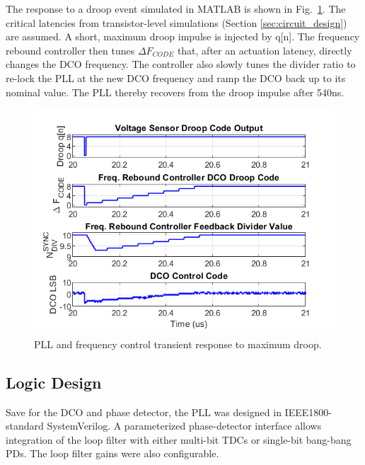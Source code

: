 \documentclass[twoside,9pt,journal,letterpage]{IEEEtran}
\begin{document}
The response to a droop event simulated in MATLAB is shown in Fig.\ \ref{fig:drooptransient}. The critical latencies from transistor-level simulations (Section \ref{sec:circuit_design}) are assumed. A short, maximum droop impulse is injected by q[n]. The frequency rebound controller then tunes $\Delta F_{CODE}$ that, after an actuation latency, directly changes the DCO frequency. The controller also slowly tunes the divider ratio to re-lock the PLL at the new DCO frequency and ramp the DCO back up to its nominal value. The PLL thereby recovers from the droop impulse after 540ns.

\vspace{-5pt}
\begin{figure}[h]
	\centering
	\includegraphics[width=\columnwidth]{fig_drooptransient}
	\caption{PLL and frequency control transient response to maximum droop.}
	\label{fig:drooptransient}
\end{figure}

\vspace{-3pt}
\subsection{Logic Design}
\label{sec:logic_design}

Save for the DCO and phase detector, the PLL was designed in IEEE1800-standard SystemVerilog. A parameterized phase-detector interface allows integration of the loop filter with either multi-bit TDCs or single-bit bang-bang PDs. The loop filter gains were also configurable. 

\end{document}

